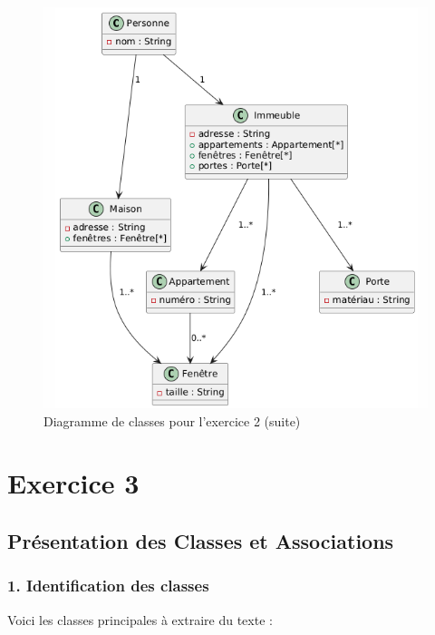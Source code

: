 \documentclass{article}
\begin{document}
\begin{figure}[h]
  \centering
  \includegraphics[width=\textwidth]{exo2-2.png}
  \caption{Diagramme de classes pour l'exercice 2 (suite)}
\end{figure}

\section*{Exercice 3}

\subsection*{Présentation des Classes et Associations}

\subsubsection*{1. Identification des classes}

Voici les classes principales à extraire du texte :
\end{document}
